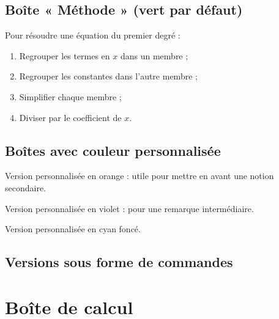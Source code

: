 \documentclass[11pt,a4paper]{article}
\begin{document}
\subsection{Boîte « Méthode » (vert par défaut)}

\begin{methode}
    Pour résoudre une équation du premier degré :
    \begin{enumerate}
        \item Regrouper les termes en $x$ dans un membre ;
        \item Regrouper les constantes dans l'autre membre ;
        \item Simplifier chaque membre ;
        \item Diviser par le coefficient de $x$.
    \end{enumerate}
\end{methode}

\subsection{Boîtes avec couleur personnalisée}

\begin{retenir}[orange]
    Version personnalisée en orange : utile pour mettre en avant une
    notion secondaire.
\end{retenir}

\begin{vigilance}[purple]
    Version personnalisée en violet : pour une remarque intermédiaire.
\end{vigilance}

\begin{methode}
    Version personnalisée en cyan foncé.
\end{methode}

\subsection{Versions sous forme de commandes}




\section{Boîte de calcul}
\end{document}

